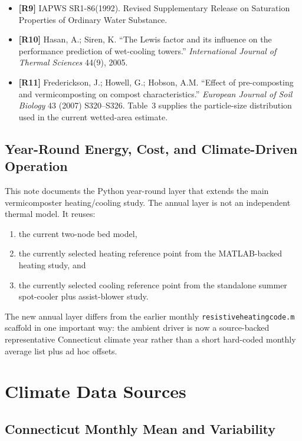 \documentclass{article}
\begin{document}
\begin{itemize}
      \emph{Eisenia foetida} in relation to temperature.'' \emph{Biotechnology
      and Bioengineering} 24(8), 1982.
\item \textbf{[R9]} IAPWS SR1-86(1992). Revised Supplementary Release on
      Saturation Properties of Ordinary Water Substance.
\item \textbf{[R10]} Hasan, A.; Siren, K. ``The Lewis factor and its
      influence on the performance prediction of wet-cooling towers.''
      \emph{International Journal of Thermal Sciences} 44(9), 2005.
\item \textbf{[R11]} Frederickson, J.; Howell, G.; Hobson, A.M.
      ``Effect of pre-composting and vermicomposting on compost
      characteristics.'' \emph{European Journal of Soil Biology} 43 (2007)
      S320--S326. Table~3 supplies the particle-size distribution used in
      the current wetted-area estimate.
\end{itemize}

\subsection{Year-Round Energy, Cost, and Climate-Driven Operation}

This note documents the Python year-round layer that extends the main
vermicomposter heating/cooling study. The annual layer is not an independent
thermal model. It reuses:
\begin{enumerate}
\item the current two-node bed model,
\item the currently selected heating reference point from the MATLAB-backed
heating study, and
\item the currently selected cooling reference point from the standalone
summer spot-cooler plus assist-blower study.
\end{enumerate}

The new annual layer differs from the earlier monthly
\texttt{resistiveheatingcode.m} scaffold in one important way: the ambient
driver is now a source-backed representative Connecticut climate year rather
than a short hard-coded monthly average list plus ad hoc offsets.

\section{Climate Data Sources}

\subsection{Connecticut Monthly Mean and Variability}
\end{document}
